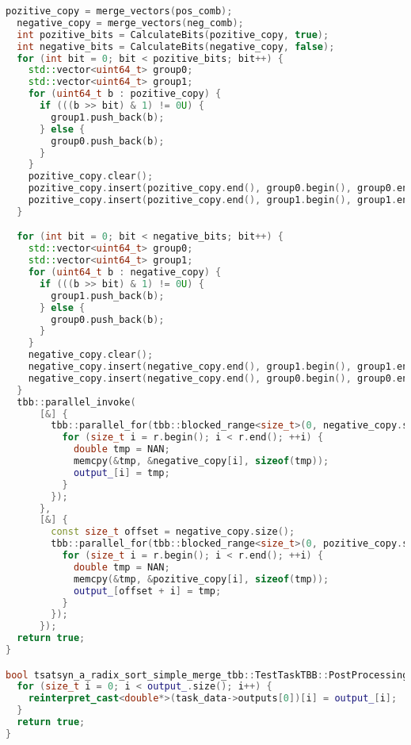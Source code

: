 \documentclass[a4paper,12pt]{article}
\begin{document}
\begin{lstlisting}[language=C++,
    breaklines=true,       % Автоматический перенос строк
    basicstyle=\small\ttfamily, % Уменьшенный шрифт
    columns=fullflexible ]
  pozitive_copy = merge_vectors(pos_comb);
  negative_copy = merge_vectors(neg_comb);
  int pozitive_bits = CalculateBits(pozitive_copy, true);
  int negative_bits = CalculateBits(negative_copy, false);
  for (int bit = 0; bit < pozitive_bits; bit++) {
    std::vector<uint64_t> group0;
    std::vector<uint64_t> group1;
    for (uint64_t b : pozitive_copy) {
      if (((b >> bit) & 1) != 0U) {
        group1.push_back(b);
      } else {
        group0.push_back(b);
      }
    }
    pozitive_copy.clear();
    pozitive_copy.insert(pozitive_copy.end(), group0.begin(), group0.end());
    pozitive_copy.insert(pozitive_copy.end(), group1.begin(), group1.end());
  }

  for (int bit = 0; bit < negative_bits; bit++) {
    std::vector<uint64_t> group0;
    std::vector<uint64_t> group1;
    for (uint64_t b : negative_copy) {
      if (((b >> bit) & 1) != 0U) {
        group1.push_back(b);
      } else {
        group0.push_back(b);
      }
    }
    negative_copy.clear();
    negative_copy.insert(negative_copy.end(), group1.begin(), group1.end());
    negative_copy.insert(negative_copy.end(), group0.begin(), group0.end());
  }
  tbb::parallel_invoke(
      [&] {
        tbb::parallel_for(tbb::blocked_range<size_t>(0, negative_copy.size()), [&](const auto& r) {
          for (size_t i = r.begin(); i < r.end(); ++i) {
            double tmp = NAN;
            memcpy(&tmp, &negative_copy[i], sizeof(tmp));
            output_[i] = tmp;
          }
        });
      },
      [&] {
        const size_t offset = negative_copy.size();
        tbb::parallel_for(tbb::blocked_range<size_t>(0, pozitive_copy.size()), [&](const auto& r) {
          for (size_t i = r.begin(); i < r.end(); ++i) {
            double tmp = NAN;
            memcpy(&tmp, &pozitive_copy[i], sizeof(tmp));
            output_[offset + i] = tmp;
          }
        });
      });
  return true;
}

bool tsatsyn_a_radix_sort_simple_merge_tbb::TestTaskTBB::PostProcessingImpl() {
  for (size_t i = 0; i < output_.size(); i++) {
    reinterpret_cast<double*>(task_data->outputs[0])[i] = output_[i];
  }
  return true;
}
    \end{lstlisting}
\end{document}
